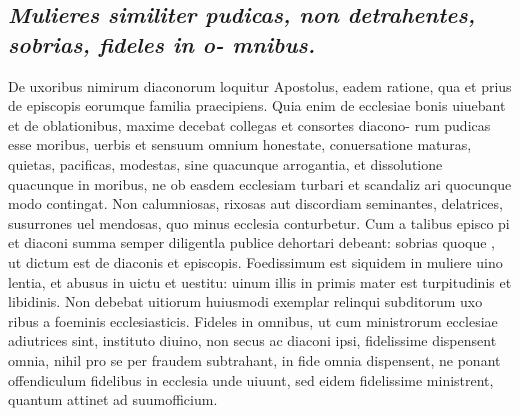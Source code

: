 \documentclass{article}
\begin{document}
\begin{pages}
\subsection*{\textit{Mulieres similiter pudicas, non detrahentes, sobrias, fideles in o- mnibus. }}\pstart De uxoribus nimirum diaconorum loquitur Apostolus, eadem ratione, qua et prius de episcopis eorumque familia praecipiens. Quia enim de ecclesiae bonis uiuebant et de oblationibus, maxime decebat collegas et consortes diacono- rum pudicas esse moribus, uerbis et sensuum omnium honestate, conuersatione maturas, quietas, pacificas, modestas, sine quacunque arrogantia, et dissolutione quacunque in moribus, ne ob easdem ecclesiam turbari et scandaliz ari quocunque  modo contingat. Non calumniosas, rixosas aut discordiam seminantes, delatrices, susurrones uel mendosas, quo minus ecclesia conturbetur. Cum a talibus episco pi et diaconi summa semper diligentla publice dehortari debeant: sobrias quoque , ut dictum est de diaconis et episcopis. Foedissimum est siquidem in muliere uino lentia, et abusus in uictu et uestitu: uinum illis in primis mater est turpitudinis et libidinis. Non debebat uitiorum huiusmodi exemplar relinqui subditorum uxo ribus a foeminis ecclesiasticis. Fideles in omnibus, ut cum ministrorum ecclesiae adiutrices sint, instituto diuino, non secus ac diaconi ipsi, fidelissime dispensent omnia, nihil pro se per fraudem subtrahant, in fide omnia dispensent, ne ponant offendiculum fidelibus in ecclesia unde uiuunt, sed eidem fidelissime ministrent, quantum attinet ad suumofficium.  \pend
{}
{}

\end{pages}
\end{document}
